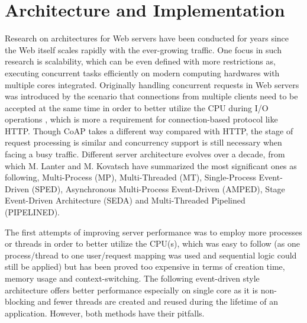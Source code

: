 \chapter{Architecture and Implementation}\label{ch4}

Research on architectures for Web servers have been conducted for years since the Web itself scales rapidly with the ever-growing traffic. One focus in such research is scalability, which can be even defined with more restrictions as, executing concurrent tasks efficiently on modern computing hardwares with multiple cores integrated. Originally handling concurrent requests in Web servers was introduced by the scenario that connections from multiple clients need to be accepted at the same time in order to better utilize the CPU during I/O operations \autocite{kovatsch2015scalable}, which is more a requirement for connection-based protocol like HTTP. Though CoAP takes a different way compared with HTTP, the stage of request processing is similar and concurrency support is still necessary when facing a busy traffic. Different server architecture evolves over a decade, from which M. Lanter \autocite{lanter2013scalability} and M. Kovatsch \autocite{kovatsch2015scalable} have summarized the most significant ones as following, Multi-Process (MP), Multi-Threaded (MT), Single-Process Event-Driven (SPED), Asynchronous Multi-Process Event-Driven (AMPED), Stage Event-Driven Architecture (SEDA) and Multi-Threaded Pipelined (PIPELINED). 

The first attempts of improving server performance was to employ more processes or threads in order to better utilize the CPU(s), which was easy to follow (as one process/thread to one user/request mapping was used and sequential logic could still be applied) but has been proved too expensive in terms of creation time, memory usage and context-switching. The following event-driven style architecture offers better performance especially on single core as it is non-blocking and fewer threads are created and reused during the lifetime of an application. However, both methods have their pitfalls. 

